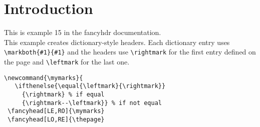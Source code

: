 \documentclass[twoside,twocolumn]{article}
\newcommand{\mymarks}{
   \ifthenelse{\equal{\leftmark}{\rightmark}}
     {\rightmark} %
     {\rightmark--\leftmark}} %
\begin{document}
\section{Introduction}
\thispagestyle{plain}
\begin{boxedminipage}{\textwidth}
This is example 15 in the fancyhdr documentation.\\
This example creates dictionary-style headers. Each dictionary entry uses \verb|\markboth{#1}{#1}| and the headers use \verb|\rightmark| for the first entry defined on
the page and \verb|\leftmark| for the last one.
\begin{verbatim}
\newcommand{\mymarks}{
   \ifthenelse{\equal{\leftmark}{\rightmark}}
     {\rightmark} % if equal
     {\rightmark--\leftmark}} % if not equal
 \fancyhead[LE,RO]{\mymarks}
 \fancyhead[LO,RE]{\thepage}
\end{verbatim}
\end{boxedminipage}
\end{document}

